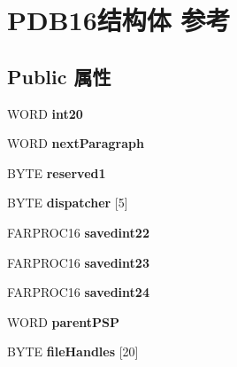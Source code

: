 \hypertarget{struct_p_d_b16}{}\section{P\+D\+B16结构体 参考}
\label{struct_p_d_b16}
\subsection*{Public 属性}
\begin{DoxyCompactItemize}
\item 
\mbox{\label{struct_p_d_b16_a164ed87bfd6a0c2e30c461df84408f65}} 
W\+O\+RD {\bfseries int20}
\item 
\mbox{\label{struct_p_d_b16_a6c7289e3b17f4a8c684463c8ecbd91cf}} 
W\+O\+RD {\bfseries next\+Paragraph}
\item 
\mbox{\label{struct_p_d_b16_a873250c35f5c7047ba73885245f4bd59}} 
B\+Y\+TE {\bfseries reserved1}
\item 
\mbox{\label{struct_p_d_b16_abca54294d93412dc72afa7409fe8e417}} 
B\+Y\+TE {\bfseries dispatcher} \mbox{[}5\mbox{]}
\item 
\mbox{\label{struct_p_d_b16_a017567f73079146643a8deed68571fba}} 
F\+A\+R\+P\+R\+O\+C16 {\bfseries savedint22}
\item 
\mbox{\label{struct_p_d_b16_ae1fbc971b90b26d3b6c711d6b0a46af4}} 
F\+A\+R\+P\+R\+O\+C16 {\bfseries savedint23}
\item 
\mbox{\label{struct_p_d_b16_a2d9996651ad4fb1cd099f43212ecd323}} 
F\+A\+R\+P\+R\+O\+C16 {\bfseries savedint24}
\item 
\mbox{\label{struct_p_d_b16_a3658d8868fbf1e9a19072397f68994a8}} 
W\+O\+RD {\bfseries parent\+P\+SP}
\item 
\mbox{\label{struct_p_d_b16_a222d8e8198863c1834bfc4784ec71770}} 
B\+Y\+TE {\bfseries file\+Handles} \mbox{[}20\mbox{]}
\item 
\mbox{\label{struct_p_d_b16_aae69d46e78e725839cad02c444ce6e35}} 

\end{DoxyCompactItemize}
